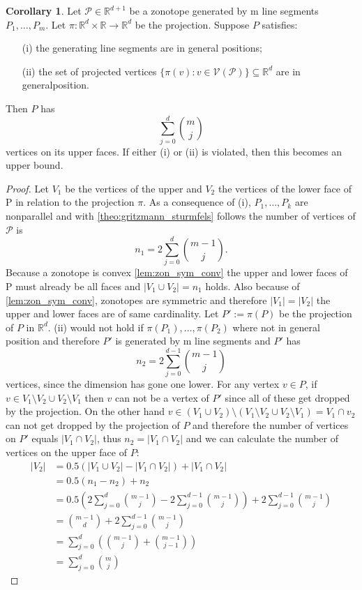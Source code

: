 \documentclass{article}
\theoremstyle{definition}
\newtheorem{corollary}[theorem]{Corollary}
\begin{document}
\begin{corollary}\cite[p.~4]{zhang2018tropical}
Let $\mathcal{P} \in \mathbb{R}^{d+1}$ be a zonotope generated by m line segments $P_1 , \dots , P_m$. Let $\pi : \mathbb{R}^{d} \times \mathbb{R} \to \mathbb{R}^{d}$ be the projection. Suppose $P$ satisfies:
\begin{itemize}
\item[(i)]
the generating line segments are in general positions;
\item[(ii)]
the set of projected vertices $\{ \pi(v) : v \in \mathcal{V}(\mathcal{P}) \} \subseteq \mathbb{R}^{d}$ are in generalposition.
\end{itemize}
Then $P$ has
$$ \sum_{j=0}^{d} \binom{m}{j} $$
vertices on its upper faces. If either (i) or (ii) is violated, then this becomes an upper bound.
\end{corollary}
\begin{proof}
Let $V_{1}$ be the vertices of the upper and $V_{2}$ the vertices of the lower face of P in relation to the projection $\pi$. As a consequence of (i), $P_{1}, \dots , P_{k}$ are nonparallel and with \ref{theo:gritzmann_sturmfels} follows the number of vertices of $\mathcal{P}$ is 
$$n_{1} = 2 \sum^{d}_{j=0} \binom{m-1}{j}.$$ 
Because a zonotope is convex \ref{lem:zon_sym_conv} the upper and lower faces of P must already be all faces and $|V_{1} \cup V_{2}| = n_{1}$ holds. Also because of \ref{lem:zon_sym_conv}, zonotopes are symmetric and therefore $|V_{1}| = |V_{2}|$ the upper and lower faces are of same cardinality. Let $P' := \pi (P)$ be the projection of $P$ in $\mathbb{R}^{d}$. (ii) would not hold if $\pi(P_{1}), \dots , \pi(P_{2})$ where not in general position and therefore $P'$ is generated by m line segments and $P'$ has 
$$n_{2}=2 \sum^{d-1}_{j=0} \binom{m-1}{j}$$
vertices, since the dimension has gone one lower. For any vertex $v \in P$, if $v \in V_{1} \setminus V_{2} \cup V_{2} \setminus V_{1}$ then $v$ can not be a vertex of $P'$ since all of these get dropped by the projection. On the other hand $v \in (V_{1} \cup V_{2}) \setminus (V_{1} \setminus V_{2} \cup V_{2} \setminus V_{1}) = V_{1} \cap v_{2}$ can not get dropped by the projection of $P$ and therefore the number of vertices on $P'$ equals $|V_{1} \cap V_{2}|$, thus $n_{2} = |V_{1} \cap V_{2}|$ and we can calculate the number of vertices on the upper face of $P$:
\begin{align*}
|V_{2}|
&= 0.5(|V_{1} \cup V_{2}| - |V_{1} \cap V_{2}|) + |V_{1} \cap V_{2}| \\
&= 0.5(n_{1} - n_{2}) + n_{2} \\
&= 0.5(2 \sum^{d}_{j=0} \binom{m-1}{j} - 2 \sum^{d-1}_{j=0} \binom{m-1}{j}) + 2 \sum^{d-1}_{j=0} \binom{m-1}{j} \\
&= \binom{m-1}{d} + 2 \sum^{d-1}_{j=0} \binom{m-1}{j} \\
&= \sum^{d}_{j=0}(\binom{m-1}{j} + \binom{m-1}{j-1}) \\
&= \sum^{d}_{j=0} \binom{m}{j}
\end{align*}
\end{proof}
\end{document}

